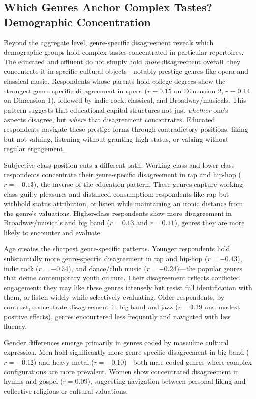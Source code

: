 \subsection{Which Genres Anchor Complex Tastes? Demographic Concentration}
\label{sec:genre-specificity}

Beyond the aggregate level, genre-specific disagreement reveals which demographic groups hold complex tastes concentrated in particular repertoires. The educated and affluent do not simply hold \emph{more} disagreement overall; they concentrate it in specific cultural objects---notably prestige genres like opera and classical music. Respondents whose parents hold college degrees show the strongest genre-specific disagreement in opera ($r = 0.15$ on Dimension 2, $r = 0.14$ on Dimension 1), followed by indie rock, classical, and Broadway/musicals. This pattern suggests that educational capital structures not just \emph{whether} one's aspects disagree, but \emph{where} that disagreement concentrates. Educated respondents navigate these prestige forms through contradictory positions: liking but not valuing, listening without granting high status, or valuing without regular engagement.

Subjective class position cuts a different path. Working-class and lower-class respondents concentrate their genre-specific disagreement in rap and hip-hop ($r = -0.13$), the inverse of the education pattern. These genres capture working-class guilty pleasures and distanced consumption: respondents like rap but withhold status attribution, or listen while maintaining an ironic distance from the genre's valuations. Higher-class respondents show more disagreement in Broadway/musicals and big band ($r = 0.13$ and $r = 0.11$), genres they are more likely to encounter and evaluate.

Age creates the sharpest genre-specific patterns. Younger respondents hold substantially more genre-specific disagreement in rap and hip-hop ($r = -0.43$), indie rock ($r = -0.34$), and dance/club music ($r = -0.24$)---the popular genres that define contemporary youth culture. Their disagreement reflects conflicted engagement: they may like these genres intensely but resist full identification with them, or listen widely while selectively evaluating. Older respondents, by contrast, concentrate disagreement in big band and jazz ($r = 0.19$ and modest positive effects), genres encountered less frequently and navigated with less fluency.

Gender differences emerge primarily in genres coded by masculine cultural expression. Men hold significantly more genre-specific disagreement in big band ($r = -0.12$) and heavy metal ($r = -0.10$)---both male-coded genres where complex configurations are more prevalent. Women show concentrated disagreement in hymns and gospel ($r = 0.09$), suggesting navigation between personal liking and collective religious or cultural valuations.


